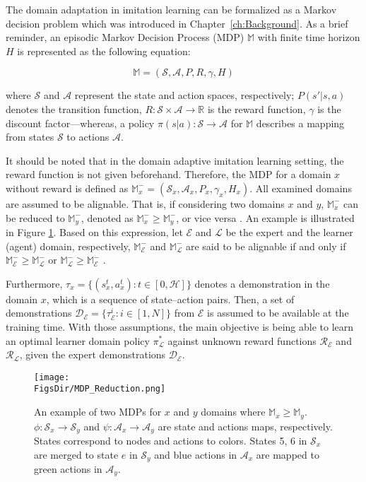 The domain adaptation in imitation learning can be formalized as a Markov decision problem which was introduced in Chapter~\ref{ch:Background}.
As a brief reminder,
an episodic Markov Decision Process (MDP) $\mathbb{M}$ with finite time horizon $H$ \cite{RL_AnIntroductionBook} is represented as the following equation:

\[
  \mathbb{M} = (\mathcal{S}, \mathcal{A}, P, R, \gamma, H)
\]

where
$\mathcal{S}$ and $\mathcal{A}$
represent the state and action spaces,
respectively;
$P(s'|s, a)$ denotes the transition function,
$R: \mathcal{S} \times \mathcal{A} \to \mathbb{R}$ is the reward function,
$\gamma$ is the discount factor---whereas,
a policy $\pi(s|a): \mathcal{S} \to \mathcal{A}$ for $\mathbb{M}$
describes a mapping from states $\mathcal{S}$ to actions $\mathcal{A}$.

It should be noted that in the domain adaptive imitation learning setting,
the reward function is not given beforehand.
Therefore,
the MDP for a domain $x$ without reward is defined as
$\mathbb{M}^-_x = (\mathcal{S}_x, \mathcal{A}_x, P_x, \gamma_x, H_x)$.
All examined domains are assumed to be alignable.
That is, if considering two domains $x$ and $y$, $\mathbb{M}^-_x$ can be reduced to $\mathbb{M}^-_y$,
denoted as $\mathbb{M}^-_x \ge \mathbb{M}^-_y$, or vice versa \cite{DAIL_Model_DAIL}.
An example is illustrated in Figure \ref{ch:DAIL:fig:MDP_Reduction}.
Based on this expression,
let $\mathcal{E}$ and $\mathcal{L}$ be the expert and the learner (agent) domain,
respectively,
$\mathbb{M}^-_\mathcal{E}$ and $\mathbb{M}^-_\mathcal{L}$ are said to be alignable if and only if $\mathbb{M}^-_\mathcal{E} \ge \mathbb{M}^-_\mathcal{L}$ or $\mathbb{M}^-_\mathcal{L} \ge \mathbb{M}^-_\mathcal{E}$ \cite{DAIL_Model_DAIL}.

Furthermore, $\tau_{x} = \{(s^t_{x}, a^t_{x}) : t \in [0, \mathcal{H}]\}$ denotes a demonstration in the domain $x$,
which is a sequence of state--action pairs.
Then, a set of demonstrations
$\mathcal{D}_\mathcal{E}=\{\tau^i_\mathcal{E} : i\in[1,N]\}$ from $\mathcal{E}$ is assumed to be available at the training time.
With those assumptions,
the main objective is being able to learn an optimal learner domain policy $\pi^{*}_\mathcal{L}$ against unknown reward functions $\mathcal{R}_\mathcal{E}$ and $\mathcal{R}_\mathcal{L}$, given the expert demonstrations $\mathcal{D}_{\mathcal{E}}$.

\begin{figure}[htbp!]
  \centering
  \texttt{[image: \\FigsDir/MDP\_Reduction.png]}
  \caption{An example of two MDPs for $x$ and $y$ domains where $\mathbb{M}_x \ge \mathbb{M}_y$. $\phi: \mathcal{S}_x \to \mathcal{S}_y$ and $\psi: \mathcal{A}_x \to \mathcal{A}_y$ are state and actions maps, respectively. States correspond to nodes and actions to colors. States 5, 6 in $\mathcal{S}_x$ are merged to state $e$ in $\mathcal{S}_y$ and blue actions in $\mathcal{A}_x$ are mapped to green actions in $\mathcal{A}_y$.}
  \label{ch:DAIL:fig:MDP_Reduction}
\end{figure}
